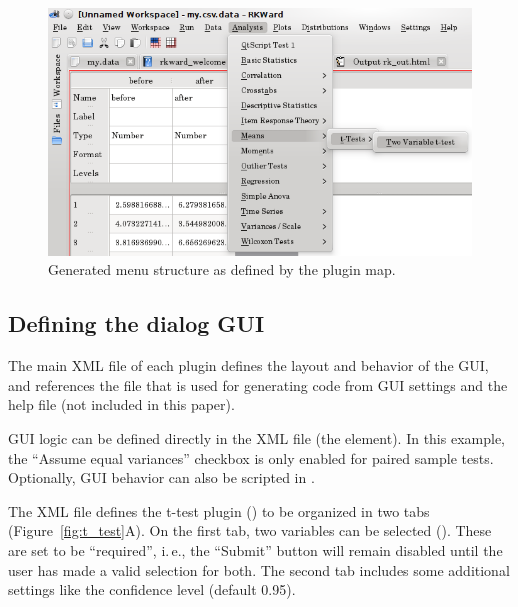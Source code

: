 \begin{figure}[t!]
 \centering
 \includegraphics{../figures/ttest-gui-example.png}
 \caption{Generated menu structure as defined by the plugin map.}
 \label{fig:ttest-gui-example}
\end{figure}


\subsection {Defining the dialog GUI}
\label{sec:defining_dialog_ui}
The main XML file of each plugin defines the layout and behavior of the GUI, and references the
 file that is used for generating  code from GUI settings and the help file (not included in this paper).

GUI logic can be defined directly in the XML file (the  element).
In this example, the ``Assume equal variances'' checkbox is only enabled for paired sample tests.
Optionally, GUI behavior can also be scripted in .

The XML file defines the t-test plugin () to be organized in two tabs (Figure~\ref{fig:t_test}A).
On the first tab, two variables can be selected (). These are set to be ``required'', i.\,e.,
the ``Submit'' button will remain disabled until the user has made a valid selection for both. The second tab includes some
additional settings like the confidence level (default 0.95).

